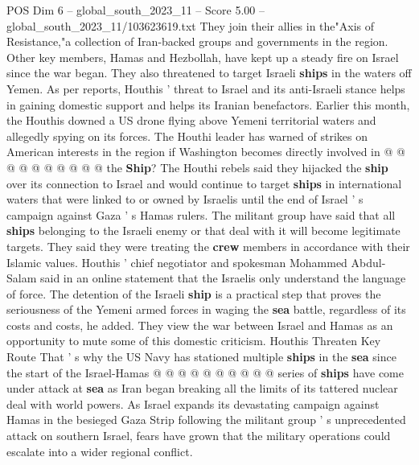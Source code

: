 \begin{textsample}{POS Dim 6 – global\_south\_2023\_11 – Score 5.00 – global\_south\_2023\_11/103623619.txt}
They join their allies in the"Axis of Resistance,"a collection of Iran-backed groups and governments in the region.
Other key members, Hamas and Hezbollah, have kept up a steady fire on Israel since the war began.
They also threatened to target Israeli \textbf{ships} in the waters off Yemen.
As per reports, Houthis ' threat to Israel and its anti-Israeli stance helps in gaining domestic support and helps its Iranian benefactors.
Earlier this month, the Houthis downed a US drone flying above Yemeni territorial waters and allegedly spying on its forces.
The Houthi leader has warned of strikes on American interests in the region if Washington becomes directly involved in @ @ @ @ @ @ @ @ @ @ the \textbf{Ship}?
The Houthi rebels said they hijacked the \textbf{ship} over its connection to Israel and would continue to target \textbf{ships} in international waters that were linked to or owned by Israelis until the end of Israel ' s campaign against Gaza ' s Hamas rulers.
The militant group have said that all \textbf{ships} belonging to the Israeli enemy or that deal with it will become legitimate targets.
They said they were treating the \textbf{crew} members in accordance with their Islamic values.
Houthis ' chief negotiator and spokesman Mohammed Abdul-Salam said in an online statement that the Israelis only understand the language of force.
The detention of the Israeli \textbf{ship} is a practical step that proves the seriousness of the Yemeni armed forces in waging the \textbf{sea} battle, regardless of its costs and costs, he added.
They view the war between Israel and Hamas as an opportunity to mute some of this domestic criticism.
Houthis Threaten Key Route That ' s why the US Navy has stationed multiple \textbf{ships} in the \textbf{sea} since the start of the Israel-Hamas @ @ @ @ @ @ @ @ @ @ series of \textbf{ships} have come under attack at \textbf{sea} as Iran began breaking all the limits of its tattered nuclear deal with world powers.
As Israel expands its devastating campaign against Hamas in the besieged Gaza Strip following the militant group ' s unprecedented attack on southern Israel, fears have grown that the military operations could escalate into a wider regional conflict.

\end{textsample}
